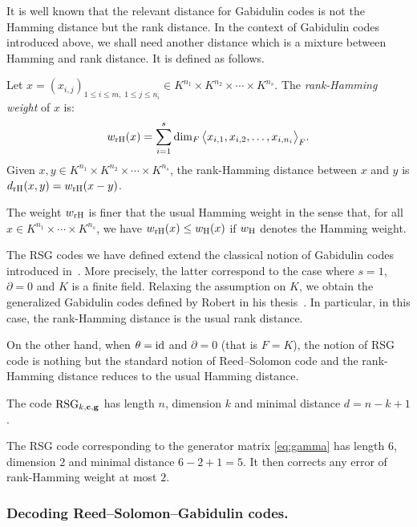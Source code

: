 \documentclass[a4paper]{llncs}
\newcommand{\id}{\textrm{\rm id}}
\newcommand{\bc}{\textbf{c}}
\newcommand{\bg}{\textbf{g}}
\newcommand{\RSG}{\textrm{\rm RSG}}
\newcommand{\wH}{w_{\textrm{\rm H}}}
\newcommand{\wrH}{w_{\textrm{\rm rH}}}
\newcommand{\drH}{d_{\textrm{\rm rH}}}
\begin{document}
It is well known that the relevant distance for Gabidulin codes is not 
the Hamming distance but the rank distance. In the context of Gabidulin 
codes introduced above, we shall need another distance which is a 
mixture between Hamming and rank distance. It is defined as follows.

\begin{definition}
Let $x = (x_{i,j})_{1 \leq i \leq m, \; 1 \leq j \leq n_i} \in
K^{n_1} \times K^{n_2} \times \cdots \times K^{n_s}$.
The \emph{rank-Hamming weight} of $x$ is:
$$\wrH(x) = 
\sum_{i=1}^s \dim_F \big< x_{i,1}, x_{i,2}, \ldots, x_{i,{n_i}} \big>_F.$$
Given $x, y \in K^{n_1} \times K^{n_2} \times \cdots \times K^{n_s}$, 
the {rank-Hamming distance} between $x$ and $y$ is $\drH(x,y) = 
\wrH(x-y)$.
\end{definition}

\begin{remark}
The weight $\wrH$ is finer that the usual Hamming weight in the 
sense that, for all $x \in K^{n_1} \times \cdots \times K^{n_s}$, 
we have $\wrH(x) \leq \wH(x)$ if $\wH$ denotes the Hamming weight.
\end{remark}

The RSG codes we have defined extend the classical notion of Gabidulin 
codes introduced in~\cite{gabidulin}. More precisely, the latter correspond to 
the case where $s = 1$, $\partial = 0$ and $K$ is a finite field. 
Relaxing the assumption on $K$, we obtain the generalized Gabidulin 
codes defined by Robert in his thesis~\cite{robert}. In particular, in this 
case, the rank-Hamming distance is the usual rank distance.

On the other hand, when $\theta = \id$ and $\partial = 0$ (that is $F = 
K$), the notion of RSG code is nothing but the standard notion of 
Reed--Solomon code and the rank-Hamming distance reduces to the 
usual Hamming distance.

\begin{proposition}
\label{prop:mindist}
The code $\RSG_{k,\bc,\bg}$ has length $n$,
dimension $k$ and minimal distance $d = n - k + 1$.
\end{proposition}

{\small
\begin{example}
The RSG code corresponding to the generator matrix \eqref{eq:gamma}
has length $6$, dimension $2$ and minimal distance $6-2+1 = 5$. It
then corrects any error of rank-Hamming weight at most $2$.
\end{example}}

\subsubsection*{Decoding Reed--Solomon--Gabidulin codes.}
\end{document}
